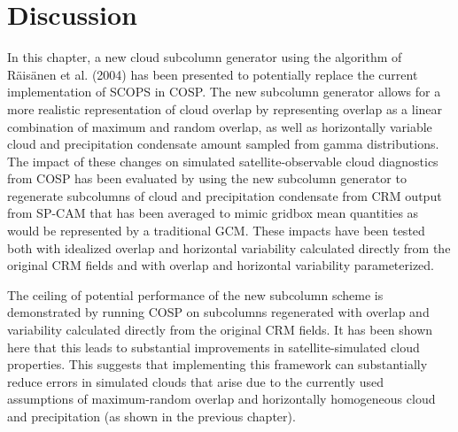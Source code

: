 \section{Discussion}\label{sec:subgrid2ux5fdiscussion}

In this chapter, a new cloud subcolumn generator using the algorithm of
Räisänen et al. (2004) has been presented to potentially replace the
current implementation of SCOPS in COSP. The new subcolumn generator
allows for a more realistic representation of cloud overlap by
representing overlap as a linear combination of maximum and random
overlap, as well as horizontally variable cloud and precipitation
condensate amount sampled from gamma distributions. The impact of these
changes on simulated satellite-observable cloud diagnostics from COSP
has been evaluated by using the new subcolumn generator to regenerate
subcolumns of cloud and precipitation condensate from CRM output from
SP-CAM that has been averaged to mimic gridbox mean quantities as would
be represented by a traditional GCM. These impacts have been tested both
with idealized overlap and horizontal variability calculated directly
from the original CRM fields and with overlap and horizontal variability
parameterized.

The ceiling of potential performance of the new subcolumn scheme is
demonstrated by running COSP on subcolumns regenerated with overlap and
variability calculated directly from the original CRM fields. It has
been shown here that this leads to substantial improvements in
satellite-simulated cloud properties. This suggests that implementing
this framework can substantially reduce errors in simulated clouds that
arise due to the currently used assumptions of maximum-random overlap
and horizontally homogeneous cloud and precipitation (as shown in the
previous chapter).


